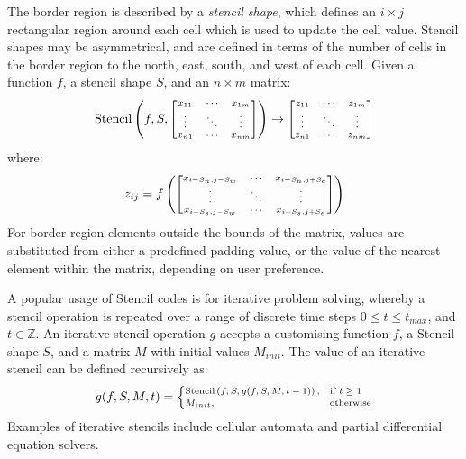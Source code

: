 \documentclass[nonatbib,preprint,9pt]{sigplanconf}
\begin{document}
The border region is described by a \emph{stencil shape}, which
defines an $i \times j$ rectangular region around each cell which is
used to update the cell value. Stencil shapes may be asymmetrical, and
are defined in terms of the number of cells in the border region to
the north, east, south, and west of each cell. Given a function $f$, a
stencil shape $S$, and an $n \times m$ matrix:
%
\begin{equation}
\scriptsize
\stencil \left( f, S,
\begin{bmatrix}
  x_{11} & \cdots & x_{1m} \\
  \vdots & \ddots & \vdots \\
  x_{n1} & \cdots & x_{nm}
\end{bmatrix} \right)
\to
\begin{bmatrix}
  z_{11} & \cdots & z_{1m} \\
  \vdots & \ddots & \vdots \\
  z_{n1} & \cdots & z_{nm}
\end{bmatrix}
\end{equation}
%
where:
%
\begin{equation}
\scriptsize
z_{ij} = f \left(
\begin{bmatrix}
  x_{i-S_n,j-S_w} & \cdots & x_{i-S_n,j+S_e} \\
  \vdots & \ddots & \vdots \\
  x_{i+S_s,j-S_w} & \cdots & x_{i+S_s,j+S_e}
\end{bmatrix} \right)
\end{equation}
%
For border region elements outside the bounds of the matrix, values
are substituted from either a predefined padding value, or the value
of the nearest element within the matrix, depending on user
preference.

A popular usage of Stencil codes is for iterative problem solving,
whereby a stencil operation is repeated over a range of discrete time
steps $0 \le t \le t_{max}$, and $t \in \mathbb{Z}$. An iterative
stencil operation $g$ accepts a customising function $f$, a Stencil
shape $S$, and a matrix $M$ with initial values $M_{init}$. The value
of an iterative stencil can be defined recursively as:
%
\begin{equation}
\scriptsize
g(f, S, M, t) =
\begin{cases}
  \stencil \left( f, S, g(f, S, M, t-1) \right),& \text{if } t \geq 1\\
  M_{init}, & \text{otherwise}
\end{cases}
\end{equation}
%
Examples of iterative stencils include cellular automata and partial
differential equation solvers. %
\end{document}
